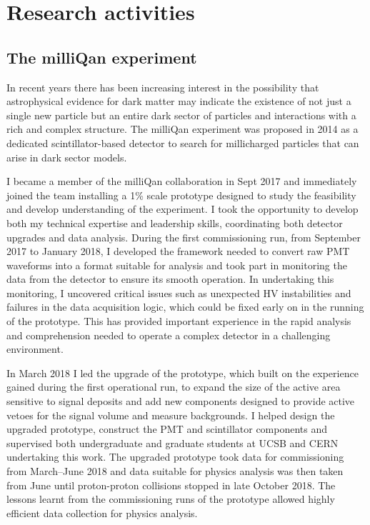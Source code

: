 \documentclass[11pt]{article}
\theoremstyle{plain} \numberwithin{equation}{section}
\theoremstyle{definition}
\begin{document}
\section*{Research activities}

\subsection*{The milliQan experiment}

In recent years there has been increasing interest in the possibility 
that astrophysical evidence for dark matter may indicate the existence 
of not just a single new particle but an entire dark sector
of particles and interactions with a rich and complex structure. The milliQan experiment 
was proposed in 2014 as a dedicated scintillator-based detector to search 
for millicharged particles that can arise in dark sector models. 

I became a member of the milliQan collaboration in Sept 2017 and immediately joined the
team installing a 1\% scale prototype designed to study the feasibility and
develop understanding of the experiment. I took the opportunity to develop
both my technical expertise and leadership skills, coordinating both
detector upgrades and data analysis. During the first commissioning run, 
from September 2017 to January 2018, I developed the framework 
needed to convert raw PMT waveforms into 
a format suitable for analysis and took part in monitoring
the data from the detector to ensure its smooth operation. 
In undertaking this monitoring, I uncovered critical issues such as unexpected
HV instabilities and failures in the data acquisition logic, which 
could be fixed early on in the running of the prototype.
This has provided important
experience in the rapid analysis and comprehension needed to operate
a complex detector in a challenging environment. 

In March 2018 I led the upgrade of the prototype, which built on the experience 
gained during the first operational run, to expand the size of the active area
sensitive to signal deposits and add new components designed to provide
active vetoes for the signal volume and measure backgrounds. I helped design the upgraded prototype,
construct the PMT and scintillator components and 
supervised both undergraduate and graduate students at UCSB and CERN undertaking this work.
The upgraded prototype took data for commissioning from March--June 2018 
and data suitable for physics analysis was then taken from June until 
proton-proton collisions stopped in late October 2018. 
The lessons learnt from the commissioning runs of the prototype allowed highly 
efficient data collection for physics analysis.
\end{document}
